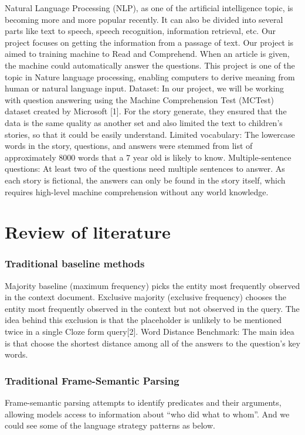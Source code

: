 \documentclass[runningheads,a4paper]{llncs}
\begin{document}
Natural Language Processing (NLP), as one of the artificial intelligence topic, is becoming more and more popular recently. It can also be divided into several parts like text to speech, speech recognition, information retrieval, etc. Our project focuses on getting the information from a passage of text. Our project is aimed to training machine to Read and Comprehend. When an article is given, the machine could automatically answer the questions. This project is one of the topic in Nature language processing, enabling computers to derive meaning from human or natural language input.  
Dataset: In our project, we will be working with question answering using the Machine Comprehension Test (MCTest) dataset created by Microsoft [1]. For the story generate, they ensured that the data is the same quality as another set and also limited the text to children’s stories, so that it could be easily understand. Limited vocabulary: The lowercase words in the story, questions, and answers were stemmed from list of approximately 8000 words that a 7 year old is likely to know. Multiple-sentence questions: At least two of the questions need multiple sentences to answer. As each story is fictional, the answers can only be found in the story itself, which requires high-level machine comprehension without any world knowledge.



\section{Review of literature}
\subsubsection*{ Traditional baseline methods}
Majority baseline (maximum frequency) picks the entity most frequently observed in the context document.
Exclusive majority (exclusive frequency) chooses the entity most frequently observed in the context but not observed in the query. The idea behind this exclusion is that the placeholder is unlikely to be mentioned twice in a single Cloze form query[2]. 
Word Distance Benchmark: The main idea is that choose the shortest distance among all of the answers to the question’s key words.


\subsubsection*{ Traditional Frame-Semantic Parsing}
Frame-semantic parsing attempts to identify predicates and their arguments, allowing models access to information about “who did what to whom”. And we could see some of the language strategy patterns as below.
\end{document}
